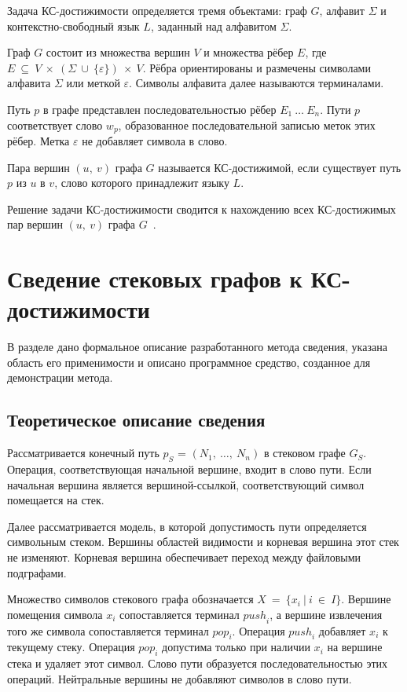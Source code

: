 Задача КС-достижимости определяется тремя объектами: граф \(G\), алфавит \(\Sigma\) и контекстно-свободный язык \(L\), заданный над алфавитом \(\Sigma\).

Граф \(G\) состоит из множества вершин \(V\) и множества рёбер \(E\), где \(E\  \subseteq \ V\  \times \ (\Sigma\  \cup \ \{\varepsilon\})\  \times \ V\). Рёбра ориентированы и размечены символами алфавита \(\Sigma\) или меткой \(\varepsilon\). Символы алфавита далее называются терминалами.

Путь \(p\) в графе представлен последовательностью рёбер \(E_{1}\ \ldots\ E_{n}\). Пути \(p\) соответствует слово \(w_{p}\), образованное последовательной записью меток этих рёбер. Метка \(\varepsilon\) не добавляет символа в слово.

Пара вершин \((u,\ v)\) графа \(G\) называется КС-достижимой, если существует путь \(p\) из \(u\) в \(v\), слово которого принадлежит языку \(L\).

Решение задачи КС-достижимости сводится к нахождению всех КС-достижимых пар вершин \((u,\ v)\) графа \(G\)~\cite{MuravevGrigorev2025}.

\section{Сведение стековых графов к КС-достижимости}\label{sec:conversion}

В разделе дано формальное описание разработанного метода сведения, указана область его применимости и описано программное средство, созданное для демонстрации метода.

\subsection{Теоретическое описание сведения}\label{sec:conversion-theory}

Рассматривается конечный путь \(p_{S}\) = \((N_{1},\ \ldots,\ N_{n})\) в стековом графе \(G_{S}\). Операция, соответствующая начальной вершине, входит в слово пути. Если начальная вершина является вершиной-ссылкой, соответствующий символ помещается на стек.

Далее рассматривается модель, в которой допустимость пути определяется символьным стеком. Вершины областей видимости и корневая вершина этот стек не изменяют. Корневая вершина обеспечивает переход между файловыми подграфами.

Множество символов стекового графа обозначается \(X\  = \ \{ x_{i}\ |\ i\  \in \ I\}\). Вершине помещения символа \(x_{i}\) сопоставляется терминал \({push}_{i}\), а вершине извлечения того же символа сопоставляется терминал \({pop}_{i}\). Операция \({push}_{i}\) добавляет \(x_{i}\) к текущему стеку. Операция \({pop}_{i}\) допустима только при наличии \(x_{i}\) на вершине стека и удаляет этот символ. Слово пути образуется последовательностью этих операций. Нейтральные вершины не добавляют символов в слово пути.


